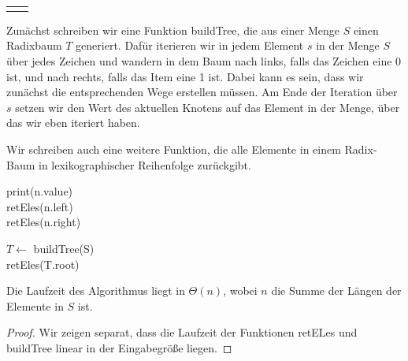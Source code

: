 \documentclass{scrartcl} %
\makeatletter
\newcommand{\headvorlage}{	
	\group{24} \hfill \textbf{\semester} \\
	\begin{tabular}{@{}l r}
		\student{Philine Stella Bock}{507316}
		\student{Devagya Sharma}{495395}
		\student{Simon Seemüller}{513084}
	\end{tabular}
	\haloesung{06}
}
\makeatother
\begin{document}
    \setcounter{auf}{0}
	\headvorlage
    \begin{aufgabe}
        Zunächst schreiben wir eine Funktion {\ttfamily buildTree}, die aus einer Menge $S$ einen Radixbaum $T$ generiert. Dafür iterieren wir in jedem Element $s$ in der Menge $S$ über jedes Zeichen und wandern in dem Baum nach links, falls das Zeichen eine 0 ist, und nach rechts, falls das Item eine 1 ist. Dabei kann es sein, dass wir zunächst die entsprechenden Wege erstellen müssen. Am Ende der Iteration über $s$ setzen wir den Wert des aktuellen Knotens auf das Element in der Menge, über das wir eben iteriert haben.
        
        \begin{algorithm}[H]
            \caption{\ttfamily buildTree(S)}
        \end{algorithm}
        Wir schreiben auch eine weitere Funktion, die alle Elemente in einem Radix-Baum in lexikographischer Reihenfolge zurückgibt.
        
        \begin{algorithm}[H]
            \caption{\ttfamily retEles(n)}
            print(n.value)\\\ttfamily
            retEles(n.left)\\
            retEles(n.right)
        \end{algorithm}
        \begin{algorithm}[H]
            \caption{Einen Radix-Baum nutzen, um Liste zu sortieren}
            $T \gets$ {\ttfamily buildTree(S)}\\
            {\ttfamily retEles(T.root)}
        \end{algorithm}
        \begin{theorem*}
            Die Laufzeit des Algorithmus liegt in $\Theta(n)$, wobei $n$ die Summe der Längen der Elemente in $S$ ist.
        \end{theorem*}
        \begin{proof}
            Wir zeigen separat, dass die Laufzeit der Funktionen {\ttfamily retELes} und {\ttfamily buildTree} linear in der Eingabegröße liegen.


\end{proof}
\end{aufgabe}
\end{document}
